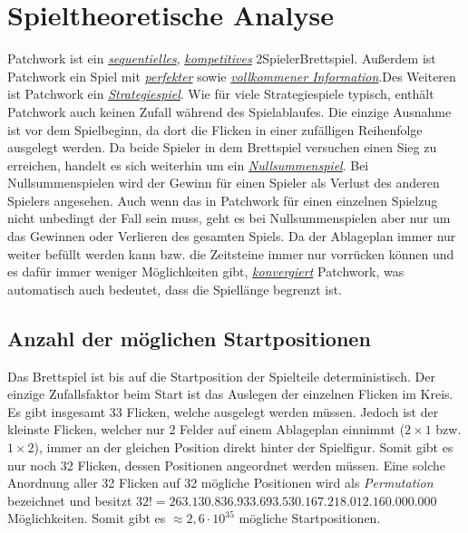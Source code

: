 \section{Spieltheoretische Analyse}

Patchwork ist ein \hyperref[text:game-theory-sequenziell]{\emph{sequentielles}}, \hyperref[text:game-theory-kompetitiv]{\emph{kompetitives}} 2\textendash{}Spieler\textendash{}Brettspiel. Außerdem ist Patchwork ein Spiel mit \hyperref[text:game-theory-perfekte-information]{\emph{perfekter}} sowie \hyperref[text:game-theory-vollkommene-information]{\emph{vollkommener Information}}.Des Weiteren ist Patchwork ein \hyperref[text:game-theory-strategiespiel]{\emph{Strategiespiel}}. Wie für viele Strategiespiele typisch, enthält Patchwork auch keinen Zufall während des Spielablaufes. Die einzige Ausnahme ist vor dem Spielbeginn, da dort die Flicken in einer zufälligen Reihenfolge ausgelegt werden. Da beide Spieler in dem Brettspiel versuchen einen Sieg zu erreichen, handelt es sich weiterhin um ein \hyperref[text:game-theory-nullsummenspiel]{\emph{Nullsummenspiel}}. Bei Nullsummenspielen wird der Gewinn für einen Spieler als Verlust des anderen Spielers angesehen. Auch wenn das in Patchwork für einen einzelnen Spielzug nicht unbedingt der Fall sein muss, geht es bei Nullsummenspielen aber nur um das Gewinnen oder Verlieren des gesamten Spiels. Da der Ablageplan immer nur weiter befüllt werden kann bzw. die Zeitsteine immer nur vorrücken können und es dafür immer weniger Möglichkeiten gibt, \hyperref[text:game-theory-konvergenz]{\emph{konvergiert}} Patchwork, was automatisch auch bedeutet, dass die Spiellänge begrenzt ist.

\subsection*{Anzahl der möglichen Startpositionen}

Das Brettspiel ist bis auf die Startposition der Spielteile deterministisch. Der einzige Zufallsfaktor beim Start ist das Auslegen der einzelnen Flicken im Kreis. Es gibt insgesamt 33 Flicken, welche ausgelegt werden müssen. Jedoch ist der kleinste Flicken, welcher nur 2 Felder auf einem Ablageplan einnimmt ($2\times1$ bzw. $1\times2$), immer an der gleichen Position direkt hinter der Spielfigur. Somit gibt es nur noch 32 Flicken, dessen Positionen angeordnet werden müssen. Eine solche Anordnung aller 32 Flicken auf 32 mögliche Positionen wird als \emph{Permutation} bezeichnet und besitzt $32! = 263.130.836.933.693.530.167.218.012.160.000.000$ Möglichkeiten. Somit gibt es $\approx 2{,}6 \cdot 10^{35}$ mögliche Startpositionen.

